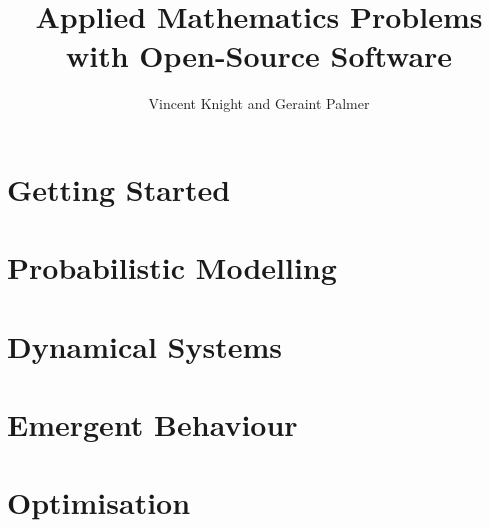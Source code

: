 \documentclass[Alon2,singlecolor,11pt]{Alon}
\title{Applied Mathematics Problems with Open-Source Software}
\author{Vincent Knight and Geraint Palmer}
\begin{document}
\frontmatter



\halftitle

\booktitle

\locpage

\cleardoublepage
\setcounter{page}{7} %
\tableofcontents

%
%



\mainmatter

\part{Getting Started}


\part{Probabilistic Modelling}


\part{Dynamical Systems}


\part{Emergent Behaviour}


\part{Optimisation}



\printbibliography

\printindex
\cleardoublepage
\end{document}
